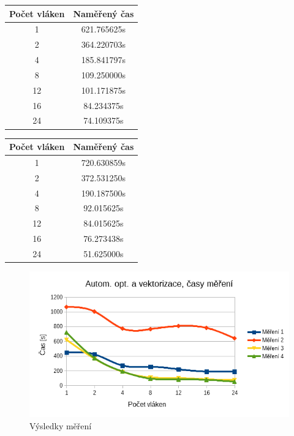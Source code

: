 \documentclass[12pt]{article}
\begin{document}
\begin{table}[H]
\parbox{.45\linewidth}{
%
%
\begin{center}
\begin{tabular}{ c | c }
\textbf{Počet vláken} & \textbf{Naměřený čas} \\ \hline \hline 
1 & 621.765625s \\ \hline
2 & 364.220703s \\ \hline
4 & 185.841797s \\ \hline
8 & 109.250000s \\ \hline
12 & 101.171875s \\ \hline
16 & 84.234375s \\ \hline
24 & 74.109375s \\ \hline
\end{tabular}
\end{center}
}
\hfill
\parbox{.45\linewidth}{
%
%
\begin{center}
\begin{tabular}{ c | c }
\textbf{Počet vláken} & \textbf{Naměřený čas} \\ \hline \hline 
1 & 720.630859s \\ \hline
2 & 372.531250s \\ \hline
4 & 190.187500s \\ \hline
8 & 92.015625s \\ \hline
12 & 84.015625s \\ \hline
16 & 76.273438s \\ \hline
24 & 51.625000s \\ \hline
\end{tabular}
\end{center}
}
\end{table}

\begin{figure}[H]
  \begin{center}
     \includegraphics[width=12cm]{images/sdruzene/openmp/autotime.png}
    \caption{Výsledky měření} 
  \end{center}
\end{figure}
\end{document}
